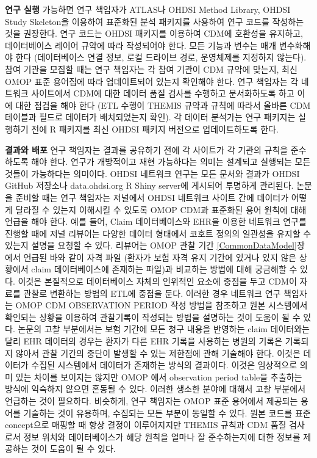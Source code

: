 \documentclass[11pt]{book}
\theoremstyle{definition}
\theoremstyle{definition}
\theoremstyle{definition}
\theoremstyle{remark}
\begin{document}
\textbf{연구 실행} 가능하면 연구 책임자가 ATLAS나 OHDSI Method Library,
OHDSI Study Skeleton을 이용하여 표준화된 분석 패키지를 사용하여 연구
코드를 작성하는 것을 권장한다. 연구 코드는 OHDSI 패키지를 이용하여 CDM에
호환성을 유지하고, 데이터베이스 레이어 규약에 따라 작성되어야 한다. 모든
기능과 변수는 매개 변수화해야 한다 (데이터베이스 연결 정보, 로컬
드라이브 경로, 운영체제를 지정하지 않는다). 참여 기관을 모집할 때는 연구
책임자는 각 참여 기관이 CDM 규약에 맞는지, 최신 OMOP 표준 용어집에 따라
업데이트되어 있는지 확인해야 한다. 연구 책임자는 각 네트워크 사이트에서
CDM에 대한 데이터 품질 검사를 수행하고 문서화하도록 하고 이에 대한
점검을 해야 한다 (ETL 수행이 THEMIS 규약과 규칙에 따라서 올바른 CDM
테이블과 필드로 데이터가 배치되었는지 확인). 각 데이터 분석가는 연구
패키지는 실행하기 전에 R 패키지를 최신 OHDSI 패키지 버전으로
업데이트하도록 한다.

\textbf{결과와 배포} 연구 책임자는 결과를 공유하기 전에 각 사이트가 각
기관의 규칙을 준수하도록 해야 한다. 연구가 개방적이고 재현 가능하다는
의미는 설계되고 실행되는 모든 것들이 가능하다는 의미이다. OHDSI 네트워크
연구는 모든 문서와 결과가 OHDSI GitHub 저장소나 data.ohdsi.org R Shiny
server에 게시되어 투명하게 관리된다. 논문을 준비할 때는 연구 책임자는
저널에서 OHDSI 네트워크 사이트 간에 데이터가 어떻게 달라질 수 있는지
이해시킬 수 있도록 OMOP CDM과 표준화된 용어 원칙에 대해 언급을 해야
한다. 예를 들어, Claim 데이터베이스와 EHR을 이용한 네트워크 연구를
진행할 때에 저널 리뷰어는 다양한 데이터 형태에서 코호트 정의의 일관성을
유지할 수 있는지 설명을 요청할 수 있다. 리뷰어는 OMOP 관찰 기간
\ref{CommonDataModel}장에서 언급된 바와 같이 자격 파일 (환자가 보험 자격
유지 기간에 있거나 있지 않은 상황에서 claim 데이터베이스에 존재하는
파일)과 비교하는 방법에 대해 궁금해할 수 있다. 이것은 본질적으로
데이터베이스 자체의 인위적인 요소에 중점을 두고 CDM이 자료를 관찰로
변환하는 방법의 ETL에 중점을 둔다. 이러한 경우 네트워크 연구 책임자는
OMOP CDM OBSERVATION PERIOD 작성 방법을 참조하고 원본 시스템에서
확인되는 상황을 이용하여 관찰기록이 작성되는 방법을 설명하는 것이 도움이
될 수 있다. 논문의 고찰 부분에서는 보험 기간에 모든 청구 내용을 반영하는
claim 데이터와는 달리 EHR 데이터의 경우는 환자가 다른 EHR 기록을
사용하는 병원의 기록은 기록되지 않아서 관찰 기간의 중단이 발생할 수 있는
제한점에 관해 기술해야 한다. 이것은 데이터가 수집된 시스템에서 데이터가
존재하는 방식의 결과이다. 이것은 임상적으로 의미 있는 차이를 보이지는
않지만 OMOP 에서 observation period table을 추출하는 방식에 익숙하지
않으면 혼동될 수 있다. 이러한 생소한 분야에 대해서 고찰 부분에서
언급하는 것이 필요하다. 비슷하게, 연구 책임자는 OMOP 표준 용어에서
제공되는 용어를 기술하는 것이 유용하며, 수집되는 모든 부분이 동일할 수
있다. 원본 코드를 표준 concept으로 매핑할 때 항상 결정이 이루어지지만
THEMIS 규칙과 CDM 품질 검사로서 정보 위치와 데이터베이스가 해당 원칙을
얼마나 잘 준수하는지에 대한 정보를 제공하는 것이 도움이 될 수 있다.
\end{document}
